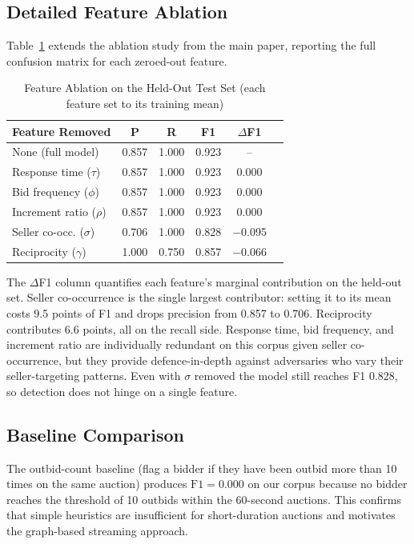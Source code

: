 \documentclass[11pt]{article}
\begin{document}
\subsection{Detailed Feature Ablation}

Table~\ref{tab:ablation_full} extends the ablation study from the main
paper, reporting the full confusion matrix for each zeroed-out feature.

\begin{table}[ht]
\centering
\caption{Feature Ablation on the Held-Out Test Set (each feature set to its training mean)}
\label{tab:ablation_full}
\begin{tabular}{lccccc}
\toprule
\textbf{Feature Removed} & \textbf{P} & \textbf{R} & \textbf{F1} & \textbf{$\Delta$F1} \\
\midrule
None (full model) & 0.857 & 1.000 & 0.923 & -- \\
Response time ($\tau$) & 0.857 & 1.000 & 0.923 & 0.000 \\
Bid frequency ($\phi$) & 0.857 & 1.000 & 0.923 & 0.000 \\
Increment ratio ($\rho$) & 0.857 & 1.000 & 0.923 & 0.000 \\
Seller co-occ. ($\sigma$) & 0.706 & 1.000 & 0.828 & $-$0.095 \\
Reciprocity ($\gamma$) & 1.000 & 0.750 & 0.857 & $-$0.066 \\
\bottomrule
\end{tabular}
\end{table}

The $\Delta$F1 column quantifies each feature's marginal contribution on
the held-out set. Seller co-occurrence is the single largest contributor:
setting it to its mean costs 9.5 points of F1 and drops precision from
0.857 to 0.706. Reciprocity contributes 6.6 points, all on the recall
side. Response time, bid frequency, and increment ratio are individually
redundant on this corpus given seller co-occurrence, but they provide
defence-in-depth against adversaries who vary their seller-targeting
patterns. Even with $\sigma$ removed the model still reaches F1 0.828, so
detection does not hinge on a single feature.

\subsection{Baseline Comparison}

The outbid-count baseline (flag a bidder if they have been outbid more
than 10 times on the same auction) produces $\text{F1} = 0.000$ on our
corpus because no bidder reaches the threshold of 10 outbids within the
60-second auctions. This confirms that simple heuristics are
insufficient for short-duration auctions and motivates the graph-based
streaming approach.
\end{document}
